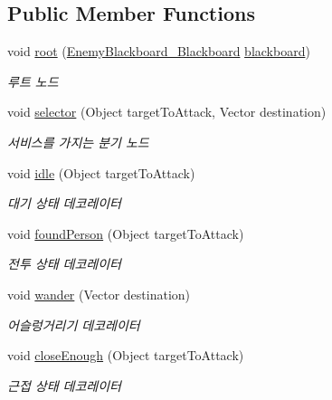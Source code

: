 \subsection*{Public Member Functions}
\begin{DoxyCompactItemize}
\item 
void \hyperlink{class_bear_behavior_tree___behavior_tree_a67e899c19fdc37eb5ed077d882ae4ad1}{root} (\hyperlink{class_enemy_blackboard___blackboard}{Enemy\+Blackboard\+\_\+\+Blackboard} \hyperlink{class_bear_behavior_tree___behavior_tree_af65805184758188534eb2100723629d7}{blackboard})
\begin{DoxyCompactList}\small\item\em 루트 노드 \end{DoxyCompactList}\item 
void \hyperlink{class_bear_behavior_tree___behavior_tree_a1d4c26a6c9f2c056a5d07f956129ba19}{selector} (Object target\+To\+Attack, Vector destination)
\begin{DoxyCompactList}\small\item\em 서비스를 가지는 분기 노드 \end{DoxyCompactList}\item 
void \hyperlink{class_bear_behavior_tree___behavior_tree_af17627dd1013988585a7afec3e36b00b}{idle} (Object target\+To\+Attack)
\begin{DoxyCompactList}\small\item\em 대기 상태 데코레이터 \end{DoxyCompactList}\item 
void \hyperlink{class_bear_behavior_tree___behavior_tree_a13134307abf8a5c1f0edef371b78f40b}{found\+Person} (Object target\+To\+Attack)
\begin{DoxyCompactList}\small\item\em 전투 상태 데코레이터 \end{DoxyCompactList}\item 
void \hyperlink{class_bear_behavior_tree___behavior_tree_a0dcee292ae4de16888b71b3eafcfa6a9}{wander} (Vector destination)
\begin{DoxyCompactList}\small\item\em 어슬렁거리기 데코레이터 \end{DoxyCompactList}\item 
void \hyperlink{class_bear_behavior_tree___behavior_tree_a1277dd95b086e24e0babaccff90a7609}{close\+Enough} (Object target\+To\+Attack)
\begin{DoxyCompactList}\small\item\em 근접 상태 데코레이터 \end{DoxyCompactList}\item 

\end{DoxyCompactItemize}
